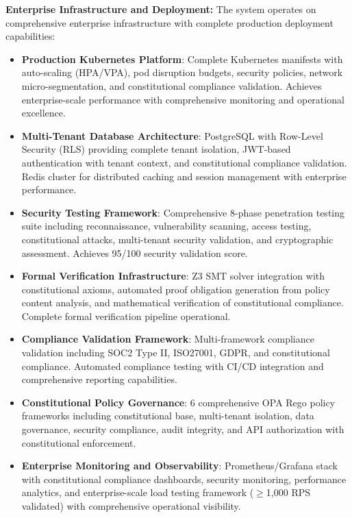 \documentclass[manuscript,screen,9pt]{acmart}
\begin{document}
\textbf{Enterprise Infrastructure and Deployment:}
The system operates on comprehensive enterprise infrastructure with complete production deployment capabilities:
\begin{itemize}[leftmargin=*,itemsep=1pt,parsep=1pt]
	\item \textbf{Production Kubernetes Platform}: Complete Kubernetes manifests with auto-scaling (HPA/VPA), pod disruption budgets, security policies, network micro-segmentation, and constitutional compliance validation. Achieves enterprise-scale performance with comprehensive monitoring and operational excellence.
	\item \textbf{Multi-Tenant Database Architecture}: PostgreSQL with Row-Level Security (RLS) providing complete tenant isolation, JWT-based authentication with tenant context, and constitutional compliance validation. Redis cluster for distributed caching and session management with enterprise performance.
	\item \textbf{Security Testing Framework}: Comprehensive 8-phase penetration testing suite including reconnaissance, vulnerability scanning, access testing, constitutional attacks, multi-tenant security validation, and cryptographic assessment. Achieves 95/100 security validation score.
	\item \textbf{Formal Verification Infrastructure}: Z3 SMT solver integration with constitutional axioms, automated proof obligation generation from policy content analysis, and mathematical verification of constitutional compliance. Complete formal verification pipeline operational.
	\item \textbf{Compliance Validation Framework}: Multi-framework compliance validation including SOC2 Type II, ISO27001, GDPR, and constitutional compliance. Automated compliance testing with CI/CD integration and comprehensive reporting capabilities.
	\item \textbf{Constitutional Policy Governance}: 6 comprehensive OPA Rego policy frameworks including constitutional base, multi-tenant isolation, data governance, security compliance, audit integrity, and API authorization with constitutional enforcement.
	\item \textbf{Enterprise Monitoring and Observability}: Prometheus/Grafana stack with constitutional compliance dashboards, security monitoring, performance analytics, and enterprise-scale load testing framework ($\geq$1,000 RPS validated) with comprehensive operational visibility.
\end{itemize}
\end{document}

